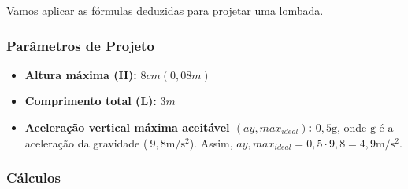 \documentclass[../resumo.tex]{subfiles}
\begin{document}
Vamos aplicar as fórmulas deduzidas para projetar uma lombada.

\subsubsection{Parâmetros de Projeto}

\begin{itemize}
	\item \textbf{Altura máxima (H):} $8 cm (0,08 m)$
	\item \textbf{Comprimento total (L):} $3 m$
	\item \textbf{Aceleração vertical máxima aceitável $(ay,max_{ideal})$:} $0,5 \mathrm{g}$, onde $\mathrm{g}$ é a aceleração
		da gravidade ($~9,8 \mathrm{m/s^2}$). Assim, $ay,max_{ideal} = 0,5\cdot9,8 = 4,9 \mathrm{m/s^2}$.
\end{itemize}

\subsubsection{Cálculos}
\end{document}
